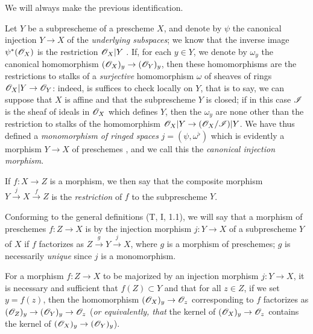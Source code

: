We will always make the previous identification.
\begin{env}[4.1.7]
\label{1.4.1.7}
Let $Y$ be a subprescheme of a prescheme $X$, and denote by $\psi$ the canonical injection
$Y\to X$ of the {\em underlying subspaces}; we know that the inverse image $\psi^*(\mathscr{O}_X)$ is
the restriction $\mathscr{O}_X|Y$ . If, for each $y\in Y$,
we denote by $\omega_y$ the canonical homomorphism $(\mathscr{O}_X)_y\to(\mathscr{O}_Y)_y$, then these
homomorphisms are the restrictions to stalks of a {\em surjective} homomorphism $\omega$
of sheaves of rings $\mathscr{O}_X|Y\to\mathscr{O}_Y$: indeed, is suffices to check locally on $Y$, that is
to say, we can suppose that $X$ is affine and that the subprescheme $Y$ is closed; if in this
case $\mathscr{I}$ is the sheaf of ideals in $\mathscr{O}_X$ which defines $Y$, then the $\omega_y$ are
none other than the restriction to stalks of the homomorphism $\mathscr{O}_X|Y\to(\mathscr{O}_X/\mathscr{I})|Y$.
We have thus defined a
{\em monomorphism of ringed spaces} 
$j=(\psi,\omega^\flat)$ which is evidently a morphism $Y\to X$ of
preschemes , and we call this the
{\em canonical injection morphism}.

If $f:X\to Z$ is a morphism, we then say that the composite morphism
$Y\xrightarrow{j}X\xrightarrow{f}Z$ is the {\em restriction} of $f$ to the subprescheme $Y$.
\end{env}

\begin{env}[4.1.8]
\label{1.4.1.8}
Conforming to the general definitions (T, I, 1.1), we will say that a morphism of
preschemes $f:Z\to X$ is  by the injection morphism $j:Y\to X$ of
a subprescheme $Y$ of $X$ if $f$ factorizes as $Z\xrightarrow{g}Y\xrightarrow{j}X$, where
$g$ is a morphism of preschemes; $g$ is necessarily {\em unique} since $j$ is a monomorphism.
\end{env}

\begin{prop}[4.1.9]
\label{1.4.1.9}
For a morphism $f:Z\to X$ to be majorized by an injection morphism $j:Y\to X$, it is necessary
and sufficient that $f(Z)\subset Y$ and that for all $z\in Z$, if we set $y=f(z)$, then the
homomorphism $(\mathscr{O}_X)_y\to\mathscr{O}_z$ corresponding to $f$ factorizes as $(\mathscr{O}_Z)_y\to(\mathscr{O}_Y)_y\to\mathscr{O}_z$
({\em or equivalently, that} the kernel of $(\mathscr{O}_X)_y\to\mathscr{O}_z$ contains the kernel of
$(\mathscr{O}_X)_y\to(\mathscr{O}_Y)_y$).
\end{prop}

